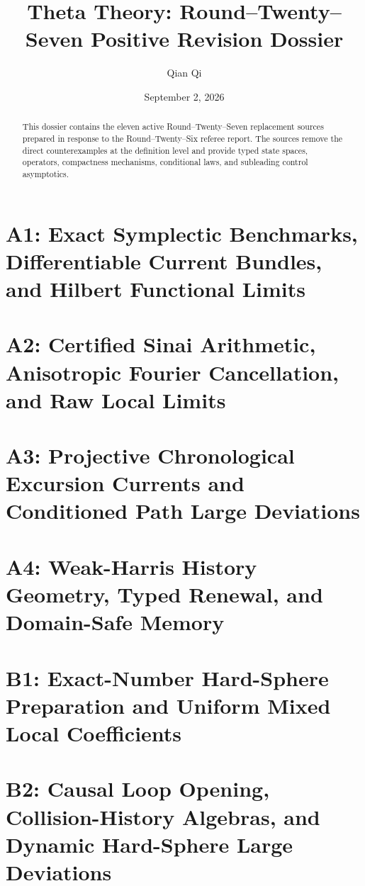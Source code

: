 \documentclass[10pt,reqno]{amsart}
\title{Theta Theory: Round--Twenty--Seven Positive Revision Dossier}
\author{Qian Qi}
\date{September 2, 2026}
\theoremstyle{definition}
\theoremstyle{remark}
\begin{document}
\begin{abstract}
This dossier contains the eleven active Round--Twenty--Seven replacement
sources prepared in response to the Round--Twenty--Six referee report.  The
sources remove the direct counterexamples at the definition level and provide
typed state spaces, operators, compactness mechanisms, conditional laws, and
subleading control asymptotics.
\end{abstract}
\maketitle
\tableofcontents
\clearpage\part{A1: Exact Symplectic Benchmarks, Differentiable Current Bundles, and Hilbert Functional Limits}

\clearpage\part{A2: Certified Sinai Arithmetic, Anisotropic Fourier Cancellation, and Raw Local Limits}

\clearpage\part{A3: Projective Chronological Excursion Currents and Conditioned Path Large Deviations}

\clearpage\part{A4: Weak-Harris History Geometry, Typed Renewal, and Domain-Safe Memory}

\clearpage\part{B1: Exact-Number Hard-Sphere Preparation and Uniform Mixed Local Coefficients}

\clearpage\part{B2: Causal Loop Opening, Collision-History Algebras, and Dynamic Hard-Sphere Large Deviations}

\end{document}
